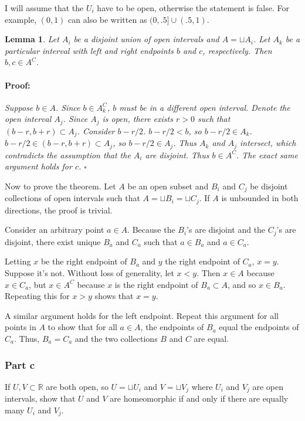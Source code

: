 \documentclass{article}
\newenvironment{proof}{\paragraph{Proof:}}{\hfill$\square$}
\newtheorem{lemma}[theorem]{Lemma}
\begin{document}
I will assume that the $U_i$ have to be open, otherwise the statement is false. For example, $(0, 1)$ can also be written as $(0, .5] \cup (.5, 1)$.

\begin{lemma}
\label{EndpointsOfDisjointUnionsAreOutside}
Let $A_i$ be a disjoint union of open intervals and $A = \sqcup A_i$. Let $A_k$ be a particular interval with left and right endpoints $b$ and $c$, respectively. Then $b, c \in A^C$.
\begin{proof}
Suppose $b \in A$. Since $b \in A_k^C$, $b$ must be in a different open interval. Denote the open interval $A_j$. Since $A_j$ is open, there exists $r > 0$ such that $(b-r, b+r) \subset A_j$. Consider $b-r/2$. $b-r/2 < b$, so $b-r/2 \in A_k$. $b-r/2 \in (b-r, b+r) \subset A_j$, so $b-r/2 \in A_j$. Thus $A_k$ and $A_j$ intersect, which contradicts the assumption that the $A_i$ are disjoint. Thus $b \in A^C$. The exact same argument holds for $c$.
\end{proof}
\end{lemma}

Now to prove the theorem. Let $A$ be an open subset and $B_i$ and $C_j$ be disjoint collections of open intervals such that $A = \sqcup B_i = \sqcup C_j$. If $A$ is unbounded in both directions, the proof is trivial.

Consider an arbitrary point $a \in A$. Because the $B_i$'s are disjoint and the $C_j$'s are disjoint, there exist unique $B_a$ and $C_a$ such that $a \in B_a$ and $a \in C_a$.

Letting $x$ be the right endpoint of $B_a$ and $y$ the right endpoint of $C_a$, $x = y$. Suppose it's not. Without loss of generality, let $x < y$. Then $x \in A$ because $x \in C_a$, but $x \in A^C$ because $x$ is the right endpoint of $B_a \subset A$, and so $x \in B_a$. Repeating this for $x > y$ shows that $x = y$.

A similar argument holds for the left endpoint. Repeat this argument for all points in $A$ to show that for all $a \in A$, the endpoints of $B_a$ equal the endpoints of $C_a$. Thus, $B_a = C_a$ and the two collections $B$ and $C$ are equal.

\subsubsection*{Part c}

If $U, V \subset \mathbb{R}$ are both open, so $U = \sqcup U_i$ and $V = \sqcup V_j$ where $U_i$ and $V_j$ are open intervals, show that $U$ and $V$ are homeomorphic if and only if there are equally many $U_i$ and $V_j$.
\end{document}
